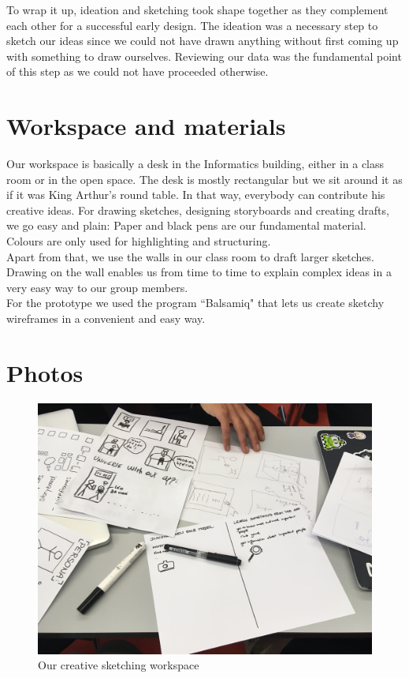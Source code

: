 \documentclass[12pt]{scrartcl}
\begin{document}
	To wrap it up, ideation and sketching took shape together as they complement each other for
	a successful early design. The ideation was a necessary step to sketch our ideas since we
	could not have drawn anything without first coming up with something to draw ourselves.
	Reviewing our data was the fundamental point of this step as we could not have proceeded
	otherwise.

\section{Workspace and materials}

	
	Our workspace is basically a desk in the Informatics building, either in a class room or in the open space. The desk is mostly rectangular 
	but we sit around it as if it was King Arthur's round table. In that way, everybody can contribute his creative ideas. For drawing sketches, 
	designing storyboards and creating drafts, we go easy and plain: Paper and black pens are our fundamental material. 
	Colours are only used for highlighting and structuring.\\
	
	Apart from that, we use the walls in our class room to draft larger sketches. Drawing on the wall enables us from time to time to explain 
	complex ideas in a very easy way to our group members.\\
	
	For the prototype we used the program ``Balsamiq" that lets us create sketchy wireframes in a convenient and easy way.
	
\section{Photos}

	
	\begin{figure}[H]
        		\centering
       		\includegraphics[width=\textwidth]{../images/group1.jpg}
       		\caption{Our creative sketching workspace}
        		\label{group1}
	\end{figure}
	
\end{document}

